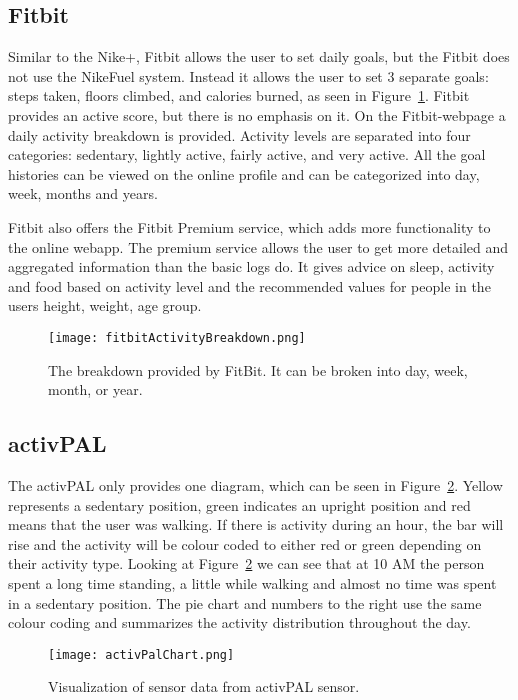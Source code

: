 \subsection{Fitbit}
Similar to the Nike+, Fitbit \cite{fitBit} allows the user to set daily goals, but the Fitbit does not use the NikeFuel system. Instead it allows the user to set 3 separate goals: steps taken, floors climbed, and calories burned, as seen in Figure~\ref{fig:fitbitActivityBreakdown}. Fitbit provides an active score, but there is no emphasis on it. On the Fitbit-webpage a daily activity breakdown is provided. Activity levels are separated into four categories: sedentary, lightly active, fairly active, and very active. All the goal histories can be viewed on the online profile and can be categorized into day, week, months and years. 

Fitbit also offers the Fitbit Premium service, which adds more functionality to the online webapp. The premium service allows the user to get more detailed and aggregated information than the basic logs do. It gives advice on sleep, activity and food based on activity level and the recommended values for people in the users height, weight, age group.

\clearpage

\begin{figure}[t]
	\centering
		\texttt{[image: fitbitActivityBreakdown.png]}
		\caption[Fitbit+ visualizations]{The breakdown provided by FitBit. It can be broken into day, week, month, or year.}
		\label{fig:fitbitActivityBreakdown}
\end{figure}

\subsection{activPAL}
\label{sec:activPALViz}
The activPAL only provides one diagram, which can be seen in Figure~\ref{fig:activPalActivityBreakdown}. Yellow represents a sedentary position, green indicates an upright position and red means that the user was walking. If there is activity during an hour, the bar will rise and the activity will be colour coded to either red or green depending on their activity type. Looking at Figure~\ref{fig:activPalActivityBreakdown} we can see that at 10 AM the person spent a long time standing, a little while walking and almost no time was spent in a sedentary position. The pie chart and numbers to the right use the same colour coding and summarizes the activity distribution throughout the day.

\begin{figure}[h!]
	\centering
		\texttt{[image: activPalChart.png]}
		\caption[activPal visualizations]{Visualization of sensor data from activPAL sensor.}
		\label{fig:activPalActivityBreakdown}
\end{figure}
